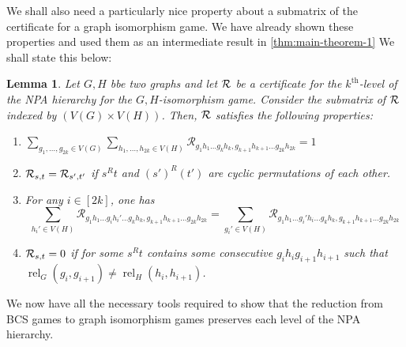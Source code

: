 \documentclass[11pt,a4paper]{article}
\theoremstyle{plain}
\newtheorem{lem}[thm]{Lemma}
\theoremstyle{remark}
\theoremstyle{definition}
\DeclareMathOperator{\rel}{rel}
\begin{document}
We shall also need a particularly nice property about a submatrix of the certificate for a graph isomorphism game. We have already shown these properties and used them as an intermediate result in \cref{thm:main-theorem-1} We shall state this below: 

\begin{lem}\label{lem:level-k-quant-iso-mat}
    Let $G, H$ bbe two graphs and let ${\mathcal R}$ be a certificate for the $k^{\text{th}}$-level of the NPA hierarchy for the $G,H$-isomorphism game. Consider the submatrix of ${\mathcal R}$ indexed by $(V(G) \times V(H))$. Then, ${\mathcal R}$ satisfies the following properties:
    \begin{enumerate}[label = \roman*.]
        \item $\sum_{g_1,\dots ,g_{2k} \in V(G)} \sum_{h_1, \dots ,h_{2k} \in V(H)} \mathcal{R}_{g_1h_1 \dots g_kh_k, g_{k+1}h_{k+1} \dots g_{2k}h_{2k}} = 1$
        \item ${\mathcal R}_{s,t} = {\mathcal R}_{s',t'}$ if $s^Rt$ and $(s')^R(t')$ are cyclic permutations of each other.
        \item For any $i \in [2k]$, one has 
        $$\sum_{h_i' \in V(H)} \mathcal{R}_{g_1h_1 \dots g_ih_i' \dots g_kh_k, g_{k+1}h_{k+1} \dots g_{2k}h_{2k}} = \sum_{g_i' \in V(H)} \mathcal{R}_{g_1h_1 \dots g_i'h_i \dots g_kh_k, g_{k+1}h_{k+1} \dots g_{2k}h_{2k}}$$ 
        \item ${\mathcal R}_{s,t} = 0$ if for some $s^Rt$ contains some consecutive $g_ih_ig_{i+1}h_{i+1}$ such that $\rel_G(g_i, g_{i+1}) \neq \rel_H(h_i, h_{i+1})$.
    \end{enumerate}
\end{lem}

We now have all the necessary tools required to show that the reduction from BCS games to graph isomorphism games preserves each level of the NPA hierarchy. 
\end{document}
